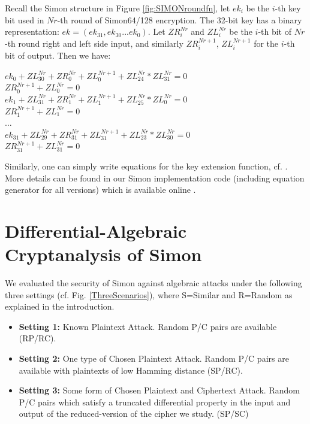 Recall the Simon structure in Figure \ref{fig:SIMONroundfn}, let $ek_i$ be the $i$-th key bit used in $Nr$-th round of Simon64/128 encryption. The 32-bit key has a binary representation: $ek=\left( ek_{31},ek_{30}...ek_{0}\right) $. Let $ZR^{Nr}_i$ and $ZL^{Nr}_i$ be the $i$-th bit of $Nr$-th round right and left side input, and similarly $ZR^{Nr+1}_i$, $ZL^{Nr+1}_i$ for the $i$-th bit of output. Then we have:

\begin{center}
$ek_0+ZL^{Nr}_{30} + ZR^{Nr}_0+ZL^{Nr+1}_0+ZL^{Nr}_{24}*ZL^{Nr}_{31} = 0$\\
$ZR^{Nr+1}_0+ZL^{Nr}_0 = 0$ \\
$ek_1+ZL^{Nr}_{31} + ZR^{Nr}_1+ZL^{Nr+1}_1+ZL^{Nr}_{25}*ZL^{Nr}_{0} = 0$\\
$ZR^{Nr+1}_1+ZL^{Nr}_1 = 0$ \\
$\dots$ \\
$ek_{31}+ZL^{Nr}_{29} + ZR^{Nr}_{31}+ZL^{Nr+1}_{31}+ZL^{Nr}_{23}*ZL^{Nr}_{30} = 0$\\
$ZR^{Nr+1}_{31}+ZL^{Nr}_{31} = 0$ 
\end{center}

Similarly, one can simply write equations for the key extension function, cf. \cite{NSAciphers}. More details can be found in our Simon implementation code (including equation generator for all versions) which is available online \cite{SongSimonSpeckGithub}.
\section{Differential-Algebraic Cryptanalysis of Simon}\label{Sec:DAcSimon}

We evaluated the security of Simon against algebraic attacks under the following
three settings (cf. Fig. \ref{ThreeScenarios}), where S=Similar and R=Random
as explained in the introduction.

\begin{itemize}
	\item \textbf{Setting 1:}  Known Plaintext Attack. Random P/C pairs are available (RP/RC). 
	\item \textbf{Setting 2:} One type of Chosen Plaintext Attack.  Random P/C pairs are available with plaintexts of low Hamming distance (SP/RC).
	\item \textbf{Setting 3:} Some form of Chosen Plaintext and Ciphertext Attack. Random P/C pairs which satisfy a truncated differential property in the input and output of the reduced-version of the cipher we study.  (SP/SC) %
\end{itemize}

